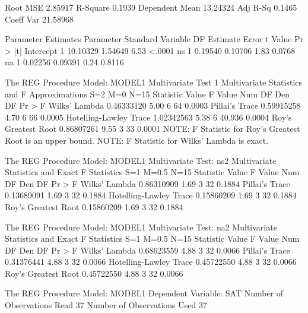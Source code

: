 \documentclass{article}
\begin{document}
\begin{Woutput}
Root MSE              2.85917    R-Square     0.1939
Dependent Mean       13.24324    Adj R-Sq     0.1465
Coeff Var            21.58968

                        Parameter Estimates
                     Parameter       Standard
Variable     DF       Estimate          Error    t Value    Pr > |t|
Intercept     1       10.10329        1.54649       6.53      <.0001
ns            1        0.19540        0.10706       1.83      0.0768
na            1        0.02256        0.09391       0.24      0.8116

The REG Procedure
Model: MODEL1
Multivariate Test 1
                 Multivariate Statistics and F Approximations
                              S=2    M=0    N=15
Statistic                        Value    F Value    Num DF    Den DF    Pr > F
Wilks' Lambda               0.46333120       5.00         6        64    0.0003
Pillai's Trace              0.59915258       4.70         6        66    0.0005
Hotelling-Lawley Trace      1.02342563       5.38         6    40.936    0.0004
Roy's Greatest Root         0.86807261       9.55         3        33    0.0001
         NOTE: F Statistic for Roy's Greatest Root is an upper bound.
                 NOTE: F Statistic for Wilks' Lambda is exact.

The REG Procedure
Model: MODEL1
Multivariate Test: ns2
                Multivariate Statistics and Exact F Statistics
                             S=1    M=0.5    N=15
Statistic                        Value    F Value    Num DF    Den DF    Pr > F
Wilks' Lambda               0.86310909       1.69         3        32    0.1884
Pillai's Trace              0.13689091       1.69         3        32    0.1884
Hotelling-Lawley Trace      0.15860209       1.69         3        32    0.1884
Roy's Greatest Root         0.15860209       1.69         3        32    0.1884

The REG Procedure
Model: MODEL1
Multivariate Test: na2
                Multivariate Statistics and Exact F Statistics
                             S=1    M=0.5    N=15
Statistic                        Value    F Value    Num DF    Den DF    Pr > F
Wilks' Lambda               0.68623559       4.88         3        32    0.0066
Pillai's Trace              0.31376441       4.88         3        32    0.0066
Hotelling-Lawley Trace      0.45722550       4.88         3        32    0.0066
Roy's Greatest Root         0.45722550       4.88         3        32    0.0066

The REG Procedure
Model: MODEL1
Dependent Variable: SAT
Number of Observations Read          37
Number of Observations Used          37


\end{Woutput}
\end{document}
